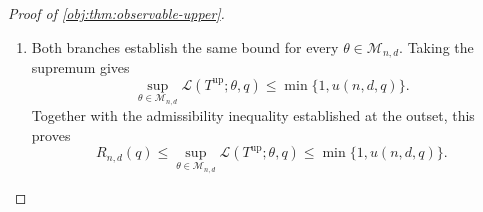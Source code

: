 \begin{proof}[Proof of \cref{obj:thm:observable-upper}]
\begin{enumerate}
\item
Both branches establish the same bound for every \(\theta\in\mathcal M_{n,d}\). Taking the supremum gives
\[
\sup_{\theta\in\mathcal M_{n,d}}
\mathcal L(T^{\mathrm{up}};\theta,q)
\le\min\{1,u(n,d,q)\}.
\]
Together with the admissibility inequality established at the outset, this proves
\[
R_{n,d}(q)
\le
\sup_{\theta\in\mathcal M_{n,d}}
\mathcal L(T^{\mathrm{up}};\theta,q)
\le
\min\{1,u(n,d,q)\}.
\]
\end{enumerate}
\end{proof}
